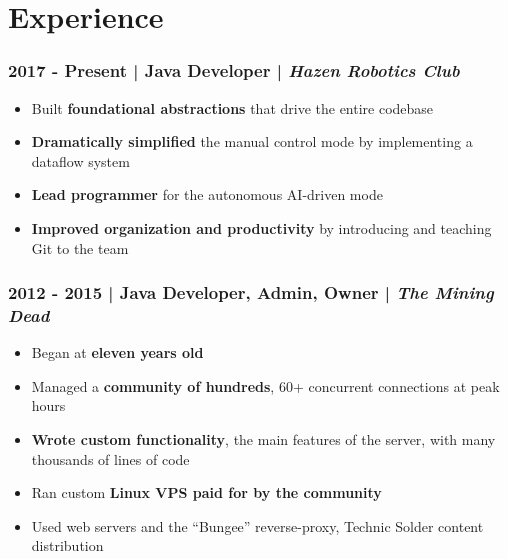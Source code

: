 \documentclass[11pt]{article}
\begin{document}
\section{Experience}
\subsubsection{2017 - Present | Java Developer | \it{Hazen Robotics Club}}
\begin{itemize}[noitemsep,nolistsep]
\item Built {\bf foundational abstractions} that drive the entire codebase
\item {\bf Dramatically simplified} the manual control mode by implementing a dataflow system
\item {\bf Lead programmer} for the autonomous AI-driven mode
\item {\bf Improved organization and productivity} by introducing and teaching Git to the team
\end{itemize}

\subsubsection{2012 - 2015 | Java Developer, Admin, Owner | \it{The Mining Dead}}
\begin{itemize}[noitemsep,nolistsep]
\item Began at {\bf eleven years old}
\item Managed a {\bf community of hundreds}, 60+ concurrent connections at peak hours
\item {\bf Wrote custom functionality}, the main features of the server, with many thousands of lines of code
\item Ran custom {\bf Linux VPS paid for by the community}
\item Used web servers and the ``Bungee'' reverse-proxy, Technic Solder content distribution
\end{itemize}
\end{document}
